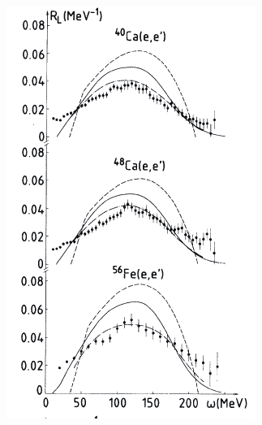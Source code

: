 \begin{figure}
\begin{subfigure}{.7\textwidth}
\centering
\includegraphics[width=.8\linewidth]{figs/R_L_q_410.png}
\label{fig:R_L_q_410}
\end{subfigure}%
\begin{subfigure}{.5\textwidth}
\centering

\end{subfigure}
\end{figure}
